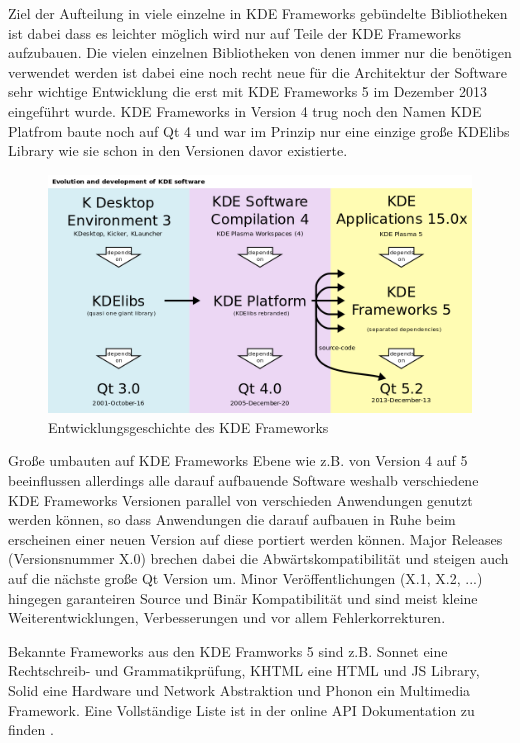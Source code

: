 Ziel der Aufteilung in viele einzelne in KDE Frameworks gebündelte Bibliotheken ist dabei dass es leichter möglich wird nur auf Teile der KDE Frameworks aufzubauen.
Die vielen einzelnen Bibliotheken von denen immer nur die benötigen verwendet werden ist dabei eine noch recht neue für die Architektur der Software sehr wichtige Entwicklung die erst mit KDE Frameworks 5 im Dezember 2013 eingeführt wurde. KDE Frameworks in Version 4 trug noch den Namen KDE Platfrom baute noch auf Qt 4 und war im Prinzip nur eine einzige große KDElibs Library wie sie schon in den Versionen davor existierte.
\begin{figure}[h]
\centering
\includegraphics[width=0.8\columnwidth]{images/Evolution_and_development_of_KDE_software}
\caption{Entwicklungsgeschichte des KDE Frameworks \cite{KDEFrameworkDevelopment}}
\label{fig:Evolution_and_development_of_KDE_software}
\end{figure}

Große umbauten auf KDE Frameworks Ebene wie z.B. von Version 4 auf 5 beeinflussen allerdings alle darauf aufbauende Software weshalb verschiedene KDE Frameworks Versionen parallel von verschieden Anwendungen genutzt werden können, so dass Anwendungen die darauf aufbauen in Ruhe beim erscheinen einer neuen Version auf diese portiert werden können. Major Releases (Versionsnummer X.0) brechen dabei die Abwärtskompatibilität und steigen auch auf die nächste große Qt Version um. Minor Veröffentlichungen (X.1, X.2, ...) hingegen garanteiren Source und Binär Kompatibilität und sind meist kleine Weiterentwicklungen, Verbesserungen und vor allem Fehlerkorrekturen.

Bekannte Frameworks aus den KDE Framworks 5 sind z.B. Sonnet eine Rechtschreib- und Grammatikprüfung, KHTML eine HTML und JS Library, Solid eine Hardware und Network Abstraktion und Phonon ein Multimedia Framework. Eine Vollständige Liste ist in der online API Dokumentation zu finden \cite{KDEDeveloperPlatform}.

